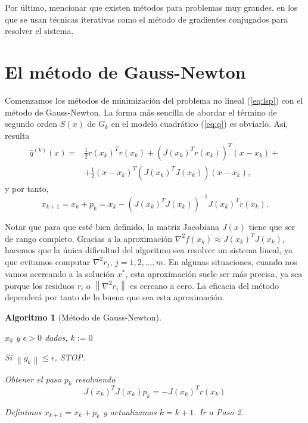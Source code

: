 \documentclass[11pt,a4paper]{book}
\newtheorem{algorithm}[theorem]{Algoritmo}
\theoremstyle{definition}
\theoremstyle{remark}
\newcommand{\norm}[1]{\left\lVert#1\right\rVert}
\begin{document}
Por último, mencionar que existen métodos para problemas muy grandes, en los que se usan técnicas iterativas como el método de gradientes conjugados para resolver el sistema.

\section{El método de Gauss-Newton}

Comenzamos los métodos de minimización del problema no lineal (\ref{eq:lsp}) con el método de Gauss-Newton. La forma más sencilla de abordar el término de segundo orden $S(x)$ de $G_k$ en el modelo cuadrático (\ref{eq:q}) es obviarlo. Así, resulta
\begin{equation}
\begin{split}
\bar q^{(k)}(x) =& \frac{1}{2}r(x_k)^Tr(x_k)+(J(x_k)^Tr(x_k))^T(x-x_k)+ \\
	& +\frac{1}{2}(x-x_k)^T(J(x_k)^TJ(x_k))(x-x_k),
\end{split}
\end{equation}
y por tanto,
\begin{equation}
	x_{k+1} = x_k + p_k = x_k -(J(x_k)^TJ(x_k))^{-1}J(x_k)^Tr(x_k).
\end{equation}

Notar que para que esté bien definido, la matriz Jacobiana $J(x)$ tiene que ser de rango completo. Gracias a la aproximación $\nabla^2 f(x_k) \approx J(x_k)^TJ(x_k)$, hacemos que la única dificultad del algoritmo sea resolver un sistema lineal, ya que evitamos computar $\nabla^2 r_j,\,j=1,2,\ldots ,m$. En algunas situaciones, cuando nos vamos acercando a la solución $x^*$, esta aproximación suele ser más precisa, ya sea porque los residuos $r_i$ o $\norm{\nabla^2 r_i}$ es cercano a cero. La eficacia del método dependerá por tanto de lo buena que sea esta aproximación.

\begin{algorithm}[Método de Gauss-Newton] \leavevmode
\label{al:g-n}
\begin{steps}
	\item $x_0$ y $\epsilon > 0$ dados, $k:=0$
	\item Si $\norm{g_k} \leq \epsilon$, STOP.   
	\item Obtener el paso $p_k$ resolviendo
		\begin{equation}
			J(x_k)^TJ(x_k)p_k = -J(x_k)^Tr(x_k)
		\end{equation}
	\item Definimos $x_{k+1} = x_k + p_k$ y actualizamos $k=k+1$. Ir a Paso 2. \quad \qedsymbol
\end{steps}
\end{algorithm}
\end{document}
